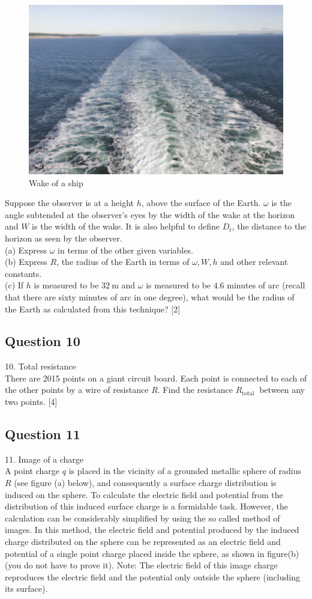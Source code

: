 \documentclass{article}
\begin{document}
\begin{figure}
	\centering
	\includegraphics[width=0.5\linewidth]{spho_book_TYS_images/2015q9.png}
	\caption{Wake of a ship}
\end{figure}
Suppose the observer is at a height $h$, above the surface of the Earth. $\omega$ is the angle subtended at the observer's eyes by the width of the wake at the horizon and $W$ is the width of the wake. It is also helpful to define $D_{t}$, the distance to the horizon as seen by the observer. \\
(a) Express $\omega$ in terms of the other given variables. \\
(b) Express $R$, the radius of the Earth in terms of $\omega, W, h$ and other relevant constants. \\
(c) If $h$ is measured to be $32 \mathrm{~m}$ and $\omega$ is measured to be $4.6$ minutes of arc (recall that there are sixty minutes of arc in one degree), what would be the radius of the Earth as calculated from this technique? [2]

\subsection{Question 10}
10. Total resistance \\
There are 2015 points on a giant circuit board. Each point is connected to each of the other points by a wire of resistance $R$. Find the resistance $R_{\text {total }}$ between any two points.  [4]

\subsection{Question 11}
11. Image of a charge \\
A point charge $q$ is placed in the vicinity of a grounded metallic sphere of radius $R$ (see figure (a) below), and consequently a surface charge distribution is induced on the sphere. To calculate the electric field and potential from the distribution of this induced surface charge is a formidable task. However, the calculation can be considerably simplified by using the so called method of images. In this method, the electric field and potential produced by the induced charge distributed on the sphere can be represented as an electric field and potential of a single point charge placed inside the sphere, as shown in figure(b) (you do not have to prove it). Note: The electric field of this image charge reproduces the electric field and the potential only outside the sphere (including its surface).
\end{document}

